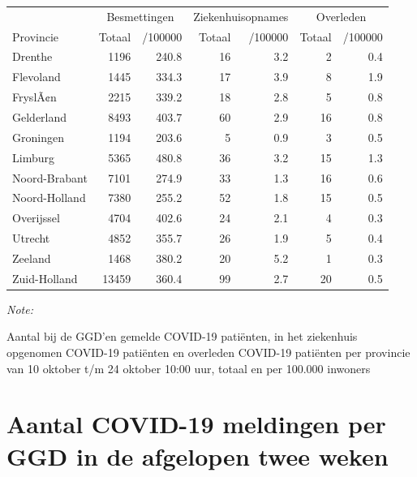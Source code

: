 \documentclass[
  english,
  man,floatsintext]{apa6}
\begin{document}
\begin{table}
\centering
\begin{threeparttable}
\begin{tabular}{lrrrrrr}
\toprule
\multicolumn{1}{c}{ } & \multicolumn{2}{c}{Besmettingen} & \multicolumn{2}{c}{Ziekenhuisopnames} & \multicolumn{2}{c}{Overleden} \\
\cmidrule(l{3pt}r{3pt}){2-3} \cmidrule(l{3pt}r{3pt}){4-5} \cmidrule(l{3pt}r{3pt}){6-7}
Provincie & Totaal & /100000 & Totaal & /100000 & Totaal & /100000\\
\midrule
Drenthe & 1196 & 240.8 & 16 & 3.2 & 2 & 0.4\\
Flevoland & 1445 & 334.3 & 17 & 3.9 & 8 & 1.9\\
FryslÃ¢n & 2215 & 339.2 & 18 & 2.8 & 5 & 0.8\\
Gelderland & 8493 & 403.7 & 60 & 2.9 & 16 & 0.8\\
Groningen & 1194 & 203.6 & 5 & 0.9 & 3 & 0.5\\
Limburg & 5365 & 480.8 & 36 & 3.2 & 15 & 1.3\\
Noord-Brabant & 7101 & 274.9 & 33 & 1.3 & 16 & 0.6\\
Noord-Holland & 7380 & 255.2 & 52 & 1.8 & 15 & 0.5\\
Overijssel & 4704 & 402.6 & 24 & 2.1 & 4 & 0.3\\
Utrecht & 4852 & 355.7 & 26 & 1.9 & 5 & 0.4\\
Zeeland & 1468 & 380.2 & 20 & 5.2 & 1 & 0.3\\
Zuid-Holland & 13459 & 360.4 & 99 & 2.7 & 20 & 0.5\\
\bottomrule
\end{tabular}
\begin{tablenotes}
\item \textit{Note: } 
\item Aantal bij de GGD’en gemelde COVID-19 patiënten, in het ziekenhuis opgenomen COVID-19 patiënten en overleden COVID-19 patiënten per provincie van 10 oktober t/m 24 oktober 10:00 uur, totaal en per 100.000 inwoners
\end{tablenotes}
\end{threeparttable}
\end{table}

\newpage

\hypertarget{aantal-covid-19-meldingen-per-ggd-in-de-afgelopen-twee-weken}{%
\section{Aantal COVID-19 meldingen per GGD in de afgelopen twee weken}\label{aantal-covid-19-meldingen-per-ggd-in-de-afgelopen-twee-weken}}
\end{document}
